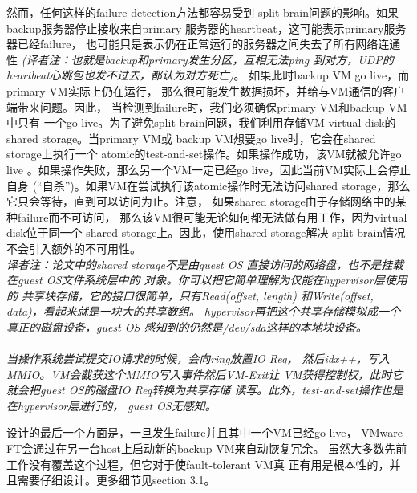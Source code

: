 然而，任何这样的failure detection方法都容易受到%
split-brain问题的影响。如果backup服务器停止接收来自primary%
服务器的heartbeat，这可能表示primary服务器已经failure，%
也可能只是表示仍在正常运行的服务器之间失去了所有网络连通性%
\emph{(译者注：也就是backup和primary发生分区，互相无法ping%
到对方，UDP的heartbeat心跳包也发不过去，都认为对方死亡)}。%
如果此时backup VM go live，而primary VM实际上仍在运行，%
那么很可能发生数据损坏，并给与VM通信的客户端带来问题。因此，%
当检测到failure时，我们必须确保primary VM和backup VM中只有%
一个go live。为了避免split-brain问题，我们利用存储VM %
virtual disk的shared storage。当primary VM或%
backup VM想要go live时，它会在shared storage上执行一个%
atomic的test-and-set操作。如果操作成功，该VM就被允许go live%
。如果操作失败，那么另一个VM一定已经go live，因此当前VM实际上会停止自身%
(“自杀”)。如果VM在尝试执行该atomic操作时无法访问shared %
storage，那么它只会等待，直到可以访问为止。注意，%
如果shared storage由于存储网络中的某种failure而不可访问，%
那么该VM很可能无论如何都无法做有用工作，因为virtual disk位于同一个%
shared storage上。因此，使用shared storage解决%
split-brain情况不会引入额外的不可用性。%
\\\emph{译者注：论文中的shared storage不是由guest OS%
直接访问的网络盘，也不是挂载在guest OS文件系统层中的%
对象。你可以把它简单理解为仅能在hypervisor层使用的%
共享块存储，它的接口很简单，只有Read(offset, length)%
和Write(offset, data)，看起来就是一块大的共享数组。%
hypervisor再把这个共享存储模拟成一个真正的磁盘设备，guest OS%
感知到的仍然是/dev/sda这样的本地块设备。%
\\\\当操作系统尝试提交IO请求的时候，会向ring放置IO Req，%
然后idx++，写入MMIO。VM会截获这个MMIO写入事件然后VM-Exit让%
VM获得控制权，此时它就会把guest OS的磁盘IO Req转换为共享存储%
读写。此外，test-and-set操作也是在hypervisor层进行的，%
guest OS无感知。}%

设计的最后一个方面是，一旦发生failure并且其中一个VM已经go live，%
VMware FT会通过在另一台host上启动新的backup VM来自动恢复冗余。%
虽然大多数先前工作没有覆盖这个过程，但它对于使fault-tolerant VM真%
正有用是根本性的，并且需要仔细设计。更多细节见section 3.1。
